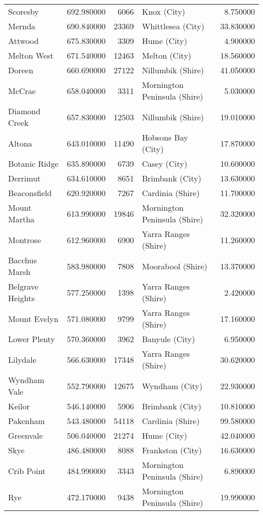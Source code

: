 \begin{longtable}{lrrlr}
Scoresby & 692.980000 & 6066 & Knox (City) & 8.750000 \\
Mernda & 690.840000 & 23369 & Whittlesea (City) & 33.830000 \\
Attwood & 675.830000 & 3309 & Hume (City) & 4.900000 \\
Melton West & 671.540000 & 12463 & Melton (City) & 18.560000 \\
Doreen & 660.690000 & 27122 & Nillumbik (Shire) & 41.050000 \\
McCrae & 658.040000 & 3311 & Mornington Peninsula (Shire) & 5.030000 \\
Diamond Creek & 657.830000 & 12503 & Nillumbik (Shire) & 19.010000 \\
Altona & 643.010000 & 11490 & Hobsons Bay (City) & 17.870000 \\
Botanic Ridge & 635.890000 & 6739 & Casey (City) & 10.600000 \\
Derrimut & 634.610000 & 8651 & Brimbank (City) & 13.630000 \\
Beaconsfield & 620.920000 & 7267 & Cardinia (Shire) & 11.700000 \\
Mount Martha & 613.990000 & 19846 & Mornington Peninsula (Shire) & 32.320000 \\
Montrose & 612.960000 & 6900 & Yarra Ranges (Shire) & 11.260000 \\
Bacchus Marsh & 583.980000 & 7808 & Moorabool (Shire) & 13.370000 \\
Belgrave Heights & 577.250000 & 1398 & Yarra Ranges (Shire) & 2.420000 \\
Mount Evelyn & 571.080000 & 9799 & Yarra Ranges (Shire) & 17.160000 \\
Lower Plenty & 570.360000 & 3962 & Banyule (City) & 6.950000 \\
Lilydale & 566.630000 & 17348 & Yarra Ranges (Shire) & 30.620000 \\
Wyndham Vale & 552.790000 & 12675 & Wyndham (City) & 22.930000 \\
Keilor & 546.140000 & 5906 & Brimbank (City) & 10.810000 \\
Pakenham & 543.480000 & 54118 & Cardinia (Shire) & 99.580000 \\
Greenvale & 506.040000 & 21274 & Hume (City) & 42.040000 \\
Skye & 486.480000 & 8088 & Frankston (City) & 16.630000 \\
Crib Point & 484.990000 & 3343 & Mornington Peninsula (Shire) & 6.890000 \\
Rye & 472.170000 & 9438 & Mornington Peninsula (Shire) & 19.990000 \\

\end{longtable}
